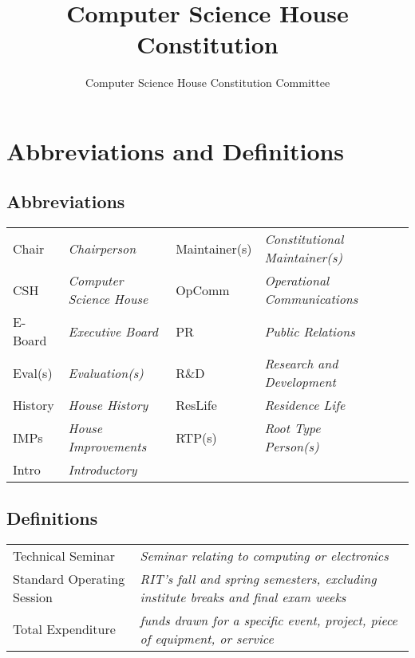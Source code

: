 \documentclass{article}
\title{Computer Science House Constitution}
\author{Computer Science House Constitution Committee}
\date{\datechanged}
\newcommand{\article}[1]{\section{#1} \label{#1}}
\begin{document}
\maketitle

\tableofcontents

\article{Abbreviations and Definitions}

\subsection{Abbreviations}
\begin{tabular}{ l  l  l l l l}
	Chair   & \textit{Chairperson}            & Maintainer(s) & \textit{Constitutional Maintainer(s)} \\
	CSH     & \textit{Computer Science House} & OpComm        & \textit{Operational Communications}   \\
	E-Board & \textit{Executive Board}        & PR            & \textit{Public Relations}             \\
	Eval(s) & \textit{Evaluation(s)}          & R\&D          & \textit{Research and Development}     \\
	History & \textit{House History}          & ResLife       & \textit{Residence Life}               \\
	IMPs    & \textit{House Improvements}     & RTP(s)        & \textit{Root Type Person(s)}          \\
	Intro   & \textit{Introductory}                                                                   \\
\end{tabular}

\subsection{Definitions}

\begin{tabular}{l l}
	Technical Seminar          & \textit{Seminar relating to computing or electronics}                                     \\
	Standard Operating Session & \textit{RIT's fall and spring semesters, excluding institute breaks and final exam weeks} \\
	Total Expenditure          & \textit{funds drawn for a specific event, project, piece of equipment, or service}
\end{tabular}
\end{document}
